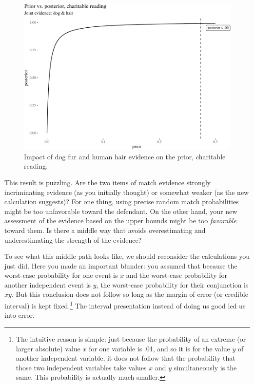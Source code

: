 \documentclass[
  10pt,
  dvipsnames,enabledeprecatedfontcommands]{scrartcl}
\begin{document}
\begin{figure}[H]

\begin{center}\includegraphics[width=0.6\linewidth]{chapter-outline_files/figure-latex/fig:charitableImpact7-1} \end{center}
\caption{Impact of dog fur and human hair evidence on the prior, charitable reading.}
\label{fig:impactOfCharitable}
\end{figure}

This result is puzzling. Are the two items of match evidence strongly
incriminating evidence (as you initially thought) or somewhat weaker (as
the new calculation suggests)? For one thing, using precise random match
probabilities might be too unfavorable toward the defendant. On the
other hand, your new assessment of the evidence based on the upper
bounds might be too \emph{favorable} toward them. Is there a middle way
that avoids overestimating and underestimating the strength of the
evidence?

To see what this middle path looks like, we should reconsider the
calculations you just did. Here you made an important blunder: you
assumed that because the worst-case probability for one event is \(x\)
and the worst-case probability for another independent event is \(y\),
the worst-case probability for their conjunction is \(xy\). But this
conclusion does not follow so long as the margin of error (or credible
interval) is kept fixed.\footnote{The intuitive reason is simple: just
  because the probability of an extreme (or larger absolute) value \(x\)
  for one variable is .01, and so it is for the value \(y\) of another
  independent variable, it does not follow that the probability that
  those two independent variables take values \(x\) and \(y\)
  simultaneously is the same. This probability is actually much smaller.}
The interval presentation instead of doing us good led us into error.
\end{document}
